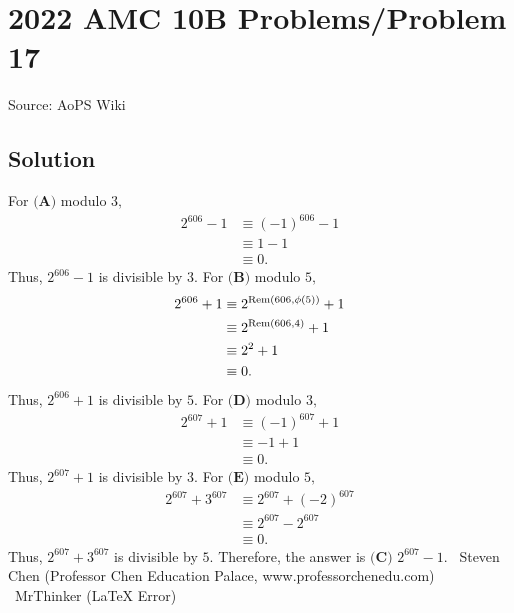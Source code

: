 \documentclass[12pt]{article}
\begin{document}
\section*{{2022 AMC 10B Problems/Problem 17}}
Source: AoPS Wiki

\subsection*{Solution}
For $\textbf{(A)}$ modulo $3,$ \begin{align*} 2^{606} - 1 & \equiv (-1)^{606} - 1 \\ & \equiv 1 - 1 \\ & \equiv 0 . \end{align*} Thus, $2^{606} - 1$ is divisible by $3.$ For $\textbf{(B)}$ modulo $5,$ \begin{align*} 2^{606} + 1 & \equiv 2^{{\rm Rem} ( 606, \phi(5) )} + 1 \\ & \equiv 2^{{\rm Rem} ( 606, 4 )} + 1 \\ & \equiv 2^2 + 1 \\ & \equiv 0 . \end{align*} Thus, $2^{606} + 1$ is divisible by $5.$ For $\textbf{(D)}$ modulo $3,$ \begin{align*} 2^{607} + 1 & \equiv (-1)^{607} + 1 \\ & \equiv - 1 + 1 \\ & \equiv 0 . \end{align*} Thus, $2^{607} + 1$ is divisible by $3.$ For $\textbf{(E)}$ modulo $5,$ \begin{align*} 2^{607} + 3^{607} & \equiv 2^{607} + (-2)^{607} \\ & \equiv 2^{607} - 2^{607} \\ & \equiv 0 . \end{align*} Thus, $2^{607} + 3^{607}$ is divisible by $5.$ Therefore, the answer is $\boxed{\textbf{(C) }2^{607} - 1}.$ ~Steven Chen (Professor Chen Education Palace, www.professorchenedu.com) ~MrThinker (LaTeX Error)
\end{document}

